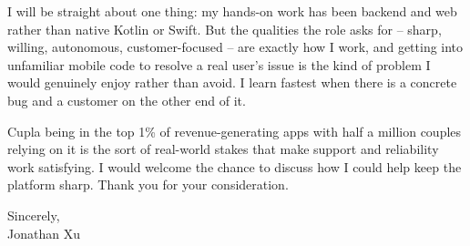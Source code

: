 \documentclass[11pt,a4paper]{article}
\begin{document}
I will be straight about one thing: my hands-on work has been backend and web rather than native Kotlin or Swift. But the qualities the role asks for -- sharp, willing, autonomous, customer-focused -- are exactly how I work, and getting into unfamiliar mobile code to resolve a real user's issue is the kind of problem I would genuinely enjoy rather than avoid. I learn fastest when there is a concrete bug and a customer on the other end of it.

Cupla being in the top 1\% of revenue-generating apps with half a million couples relying on it is the sort of real-world stakes that make support and reliability work satisfying. I would welcome the chance to discuss how I could help keep the platform sharp. Thank you for your consideration.

\vspace{0.5em}

Sincerely, \\
Jonathan Xu
\end{document}
